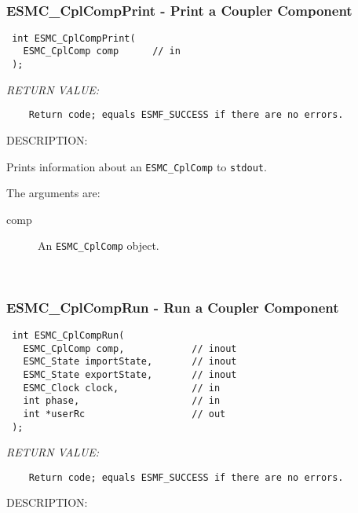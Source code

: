  
\mbox{}\hrulefill\ 
 
\subsubsection [ESMC\_CplCompPrint] {ESMC\_CplCompPrint - Print a Coupler Component}


  
\begin{verbatim} int ESMC_CplCompPrint(
   ESMC_CplComp comp      // in
 );\end{verbatim}{\em RETURN VALUE:}
\begin{verbatim}    Return code; equals ESMF_SUCCESS if there are no errors.\end{verbatim}
{\sf DESCRIPTION:\\ }


  
    Prints information about an {\tt ESMC\_CplComp} to {\tt stdout}.
  
    The arguments are:
    \begin{description}
    \item[comp]
      An {\tt ESMC\_CplComp} object.
   \end{description}
   
 
\mbox{}\hrulefill\ 
 
\subsubsection [ESMC\_CplCompRun] {ESMC\_CplCompRun - Run a Coupler Component}


  
\begin{verbatim} int ESMC_CplCompRun(
   ESMC_CplComp comp,            // inout
   ESMC_State importState,       // inout
   ESMC_State exportState,       // inout 
   ESMC_Clock clock,             // in
   int phase,                    // in
   int *userRc                   // out
 );\end{verbatim}{\em RETURN VALUE:}
\begin{verbatim}    Return code; equals ESMF_SUCCESS if there are no errors.\end{verbatim}
{\sf DESCRIPTION:\\ }


